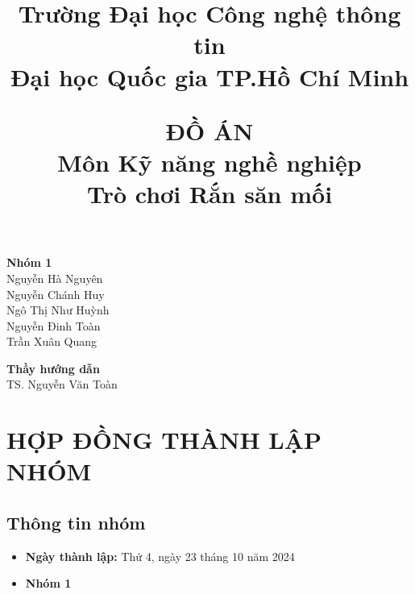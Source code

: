 \documentclass[a4paper,12pt]{article}
\title{
    \vspace{-2cm}
    \begin{center}
        \textbf{Trường Đại học Công nghệ thông tin} \\
        \textbf{Đại học Quốc gia TP.Hồ Chí Minh} \\
    \end{center}
    \vspace{1cm}
    \huge \textbf{ĐỒ ÁN} \\ 
    \Large \textbf{Môn Kỹ năng nghề nghiệp} \\ 
    \vspace{0.5cm} 
    \Large Trò chơi Rắn săn mối
}
\begin{document}
\maketitle
\thispagestyle{empty} %

\begin{center}
    \vspace{1.5cm}
    \textbf{Nhóm 1} \\[0.5cm]
    Nguyễn Hà Nguyên \\
    Nguyễn Chánh Huy \\
    Ngô Thị Như Huỳnh \\
    Nguyễn Đinh Toàn \\
    Trần Xuân Quang
\end{center}


\begin{center}
    \vspace{2cm}
    \textbf{Thầy hướng dẫn} \\
    TS. Nguyễn Văn Toàn \\
\end{center}

\newpage

\tableofcontents
\newpage


\section{HỢP ĐỒNG THÀNH LẬP NHÓM}

\maketitle

\subsection{Thông tin nhóm}
\begin{itemize}
    \item \textbf{Ngày thành lập:} Thứ 4, ngày 23 tháng 10 năm 2024
    \item \textbf{Nhóm 1}
\end{itemize}
\end{document}
